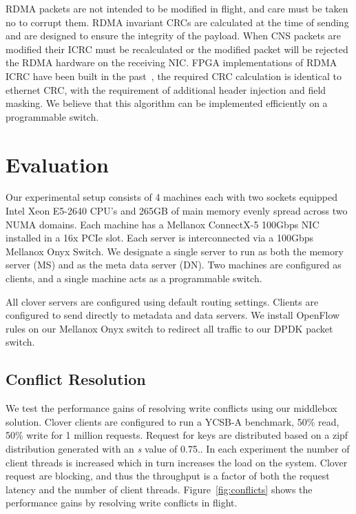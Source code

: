 RDMA packets are not intended to be modified in flight, and care must
be taken no to corrupt them. RDMA invariant CRCs are calculated at the
time of sending and are designed to ensure the integrity of the
payload. When CNS packets are modified their ICRC must be recalculated
or the modified packet will be rejected the RDMA hardware on the
receiving NIC. FPGA implementations of RDMA ICRC have been built in
the past~\cite{Mansour_2019}, the required CRC calculation is
identical to ethernet CRC, with the requirement of additional header
injection and field masking. We believe that this algorithm can be
implemented efficiently on a programmable switch.

\section{Evaluation}

Our experimental setup consists of 4 machines each with two sockets
equipped Intel Xeon E5-2640 CPU's and 265GB of main memory evenly
spread across two NUMA domains. Each machine has a Mellanox ConnectX-5
100Gbps NIC installed in a 16x PCIe slot. Each server is
interconnected via a 100Gbps Mellanox Onyx Switch. We designate a
single server to run as both the memory server (MS) and as the meta
data server (DN). Two machines are configured as clients, and a single
machine acts as a programmable switch.

All clover servers are configured using default routing settings.
Clients are configured to send directly to metadata and data servers.
We install OpenFlow rules on our Mellanox Onyx switch to redirect all
traffic to our DPDK packet switch.

\subsection{Conflict Resolution}

We test the performance gains of resolving write conflicts using our
middlebox solution. Clover clients are configured to run a YCSB-A
benchmark, 50\% read, 50\% write for 1 million requests. Request for
keys are distributed based on a zipf distribution generated with an
\textit{s} value of 0.75.. In each
experiment the number of client threads is increased which in turn
increases the load on the system. Clover request are blocking, and
thus the throughput is a factor of both the request latency and the
number of client threads. Figure~\ref{fig:conflicts} shows the
performance gains by resolving write conflicts in flight.

